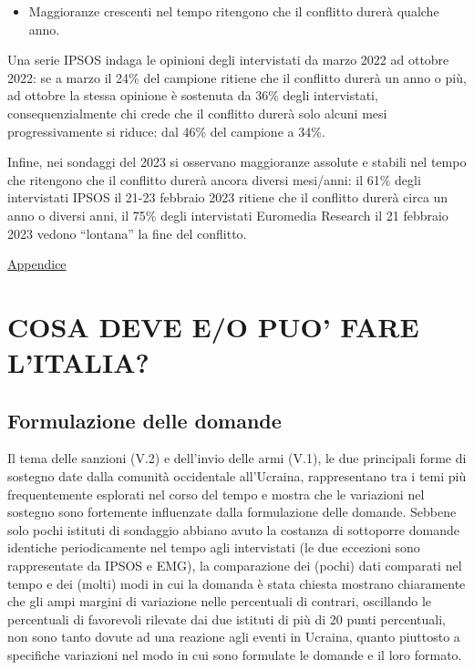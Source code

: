 \documentclass[
  openany]{book}
\providecommand{\tightlist}{%
  \setlength{\itemsep}{0pt}\setlength{\parskip}{0pt}}
\begin{document}
\begin{itemize}
\tightlist
\item
  Maggioranze crescenti nel tempo ritengono che il conflitto durerà qualche anno.
\end{itemize}

Una serie IPSOS indaga le opinioni degli intervistati da marzo 2022 ad ottobre 2022: se a marzo il 24\% del campione ritiene che il conflitto durerà un anno o più, ad ottobre la stessa opinione è sostenuta da 36\% degli intervistati, consequenzialmente chi crede che il conflitto durerà solo alcuni mesi progressivamente si riduce: dal 46\% del campione a 34\%.

Infine, nei sondaggi del 2023 si osservano maggioranze assolute e stabili nel tempo che ritengono che il conflitto durerà ancora diversi mesi/anni: il 61\% degli intervistati IPSOS il 21-23 febbraio 2023 ritiene che il conflitto durerà circa un anno o diversi anni, il 75\% degli intervistati Euromedia Research il 21 febbraio 2023 vedono ``lontana'' la fine del conflitto.

\href{https://github.com/LucianaFazio/Ucrania/blob/main/PDF_Appendice/IV.\%20La\%20guerra\%20e\%20il\%20suo\%20andamento\%20v.4.pdf}{Appendice}

\hypertarget{cosa-deve-eo-puo-fare-litalia}{%
\chapter{COSA DEVE E/O PUO' FARE L'ITALIA?}\label{cosa-deve-eo-puo-fare-litalia}}

\hypertarget{formulazione-delle-domande-3}{%
\section{Formulazione delle domande}\label{formulazione-delle-domande-3}}

Il tema delle sanzioni (V.2) e dell'invio delle armi (V.1), le due principali forme di sostegno date dalla comunità occidentale all'Ucraina, rappresentano tra i temi più frequentemente esplorati nel corso del tempo e mostra che le variazioni nel sostegno sono fortemente influenzate dalla formulazione delle domande. Sebbene solo pochi istituti di sondaggio abbiano avuto la costanza di sottoporre domande identiche periodicamente nel tempo agli intervistati (le due eccezioni sono rappresentate da IPSOS e EMG), la comparazione dei (pochi) dati comparati nel tempo e dei (molti) modi in cui la domanda è stata chiesta mostrano chiaramente che gli ampi margini di variazione nelle percentuali di contrari, oscillando le percentuali di favorevoli rilevate dai due istituti di più di 20 punti percentuali, non sono tanto dovute ad una reazione agli eventi in Ucraina, quanto piuttosto a specifiche variazioni nel modo in cui sono formulate le domande e il loro formato.
\end{document}
